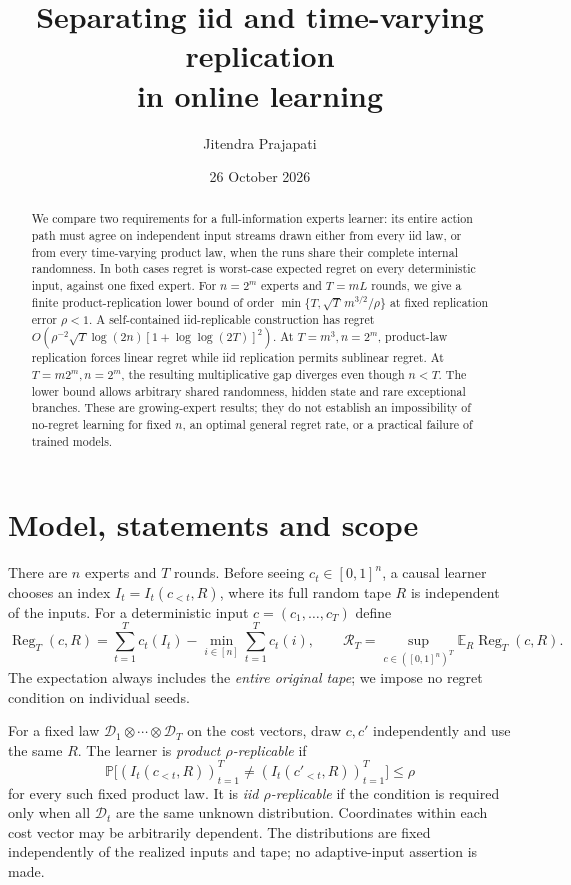 \documentclass[11pt]{article}
\title{Separating iid and time-varying replication\\in online learning}
\author{Jitendra Prajapati}
\date{26 October 2026}
\newcommand{\E}{\mathbb E}
\newcommand{\Prob}{\mathbb P}
\newcommand{\1}{\mathbf 1}
\newcommand{\Reg}{\operatorname{Reg}}
\begin{document}
\maketitle
\begin{abstract}
We compare two requirements for a full-information experts learner: its
entire action path must agree on independent input streams drawn either
from every iid law, or from every time-varying product law, when the runs
share their complete internal randomness. In both cases regret is
worst-case expected regret on every deterministic input, against one
fixed expert. For $n=2^m$ experts and $T=mL$ rounds, we give a finite
product-replication lower bound of order
$\min\{T,\sqrt T\,m^{3/2}/\rho\}$ at fixed replication error $\rho<1$.
A self-contained iid-replicable construction has regret
$O(\rho^{-2}\sqrt T\log(2n)[1+\log\log(2T)]^2)$.
At $T=m^3,n=2^m$, product-law replication forces linear regret while
iid replication permits sublinear regret. At $T=m2^m,n=2^m$, the resulting
multiplicative gap diverges even though $n<T$.
The lower bound allows arbitrary shared randomness, hidden state and
rare exceptional branches. These are growing-expert results; they do
not establish an impossibility of no-regret learning for fixed $n$,
an optimal general regret rate, or a practical failure of trained models.
\end{abstract}

\section{Model, statements and scope}

There are $n$ experts and $T$ rounds. Before seeing
$c_t\in[0,1]^n$, a causal learner chooses an index
$I_t=I_t(c_{<t},R)$, where its full random tape $R$ is independent of
the inputs. For a deterministic input $c=(c_1,\ldots,c_T)$ define
\[
 \Reg_T(c,R)=\sum_{t=1}^T c_t(I_t)-\min_{i\in[n]}\sum_{t=1}^T c_t(i),
 \qquad
 \mathcal R_T=\sup_{c\in([0,1]^n)^T}\E_R\Reg_T(c,R).
\]
The expectation always includes the \emph{entire original tape};
we impose no regret condition on individual seeds.

For a fixed law $\mathcal D_1\otimes\cdots\otimes\mathcal D_T$ on the
cost vectors, draw $c,c'$ independently and use the same $R$.
The learner is \emph{product $\rho$-replicable} if
\begin{equation}\label{eq:rep}
 \Prob\bigl[(I_t(c_{<t},R))_{t=1}^T
          \ne(I_t(c'_{<t},R))_{t=1}^T\bigr]\le\rho
\end{equation}
for every such fixed product law. It is \emph{iid $\rho$-replicable}
if the condition is required only when all $\mathcal D_t$ are the
same unknown distribution. Coordinates within each cost vector may be
arbitrarily dependent. The distributions are fixed independently of
the realized inputs and tape; no adaptive-input assertion is made.
\end{document}
